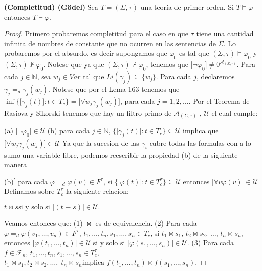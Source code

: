   \begin{theorem} \label{theorem_82}
    \PN \textbf{(Completitud) (G{\"o}del)} Sea $T = (\Sigma, \tau)$ una teoría de primer orden. Si $T \models \varphi$
    entonces $T \vdash \varphi$.
  \end{theorem}
  \begin{proof}
    Primero probaremos completitud para el caso en que $\tau $ tiene una cantidad infinita de nombres de constante que no ocurren en las sentencias de $ \Sigma $. Lo probaremos por el absurdo, es decir supongamos que $\varphi_{0} $ es tal que $(\Sigma, \tau)\models \varphi_{0}$ y $(\Sigma, \tau)\not\vdash \varphi_{0}.$ Notese que ya que $(\Sigma, \tau)\not\vdash \varphi_{0}$, tenemos que $\lbrack\lnot \varphi_{0}\rbrack\not=0^{\mathcal{A}_{(\Sigma, \tau)}}.$ Para cada $j\in \mathbb{N}$, sea $w_{j}\in Var$ tal que $ Li(\gamma _{j})\subseteq \{w_{j}\}$. Para cada $j$, declaremos $\gamma _{j}=_{d}\gamma _{j}(w_{j})$. Notese que por el Lema 163 tenemos que $\inf \{\lbrack\gamma _{j}(t)\rbrack:t\in T_{c}^{\tau }\} = \lbrack\forall w_{j}\gamma _{j}(w_{j})\rbrack$, para cada $j=1,2,\dotsc$. Por el Teorema de Rasiova y Sikorski tenemos que hay un filtro primo de $\mathcal{A}_{(\Sigma, \tau)}$ , $\mathcal{U}$ el cual cumple:

    (a) $\lbrack\lnot \varphi_{0}\rbrack\in \mathcal{U}$
    (b) para cada $j\in \mathbb{N}$, $\{\lbrack\gamma _{j}(t)\rbrack:t\in T_{c}^{\tau }\}\subseteq \mathcal{U}$ implica que $\lbrack\forall w_{j}\gamma _{j}(w_{j})\rbrack\in \mathcal{U}$
    Ya que la sucesion de las $\gamma _{i}$ cubre todas las formulas con a lo sumo una variable libre, podemos reescribir la propiedad (b) de la siguiente manera

    (b)$^{\prime}$ para cada $\varphi =_{d}\varphi (v) \in F^{\tau }$, si $\{\lbrack\varphi (t)\rbrack:t\in T_{c}^{\tau }\}\subseteq \mathcal{U}$ entonces $ \lbrack\forall v\varphi (v)\rbrack\in \mathcal{U}$
    Definamos sobre $T_{c}^{\tau }$ la siguiente relacion:

    $\displaystyle t\bowtie s\text{si y solo si }\lbrack(t\equiv s)\rbrack\in \mathcal{U}\text{.} $

    Veamos entonces que:
    (1) $\bowtie $ es de equivalencia.
    (2) Para cada $\varphi =_{d}\varphi (v_{1}, \dotsc, v_{n}) \in F^{\tau }$, $ t_{1}, \dotsc, t_{n},s_{1}, \dotsc, s_{n}\in T_{c}^{\tau }$, si $t_{1}\bowtie s_{1}$, $ t_{2}\bowtie s_{2}$, $\dotsc$, $t_{n}\bowtie s_{n}$, entonces $\lbrack\varphi (t_{1}, \dotsc, t_{n})\rbrack\in \mathcal{U}$ si y solo si $\lbrack\varphi (s_{1}, \dotsc, s_{n})\rbrack\in \mathcal{U}$.
    (3) Para cada $f\in \mathcal{F}_{n}$, $ t_{1}, \dotsc, t_{n},s_{1}, \dotsc, s_{n}\in T_{c}^{\tau }$,
    $\displaystyle t_{1}\bowtie s_{1},t_{2}\bowtie s_{2}, \dotsc, \;t_{n}\bowtie s_{n}\text{implica }f(t_{1}, \dotsc, t_{n})\bowtie f(s_{1}, \dotsc, s_{n}). $


\end{proof}
